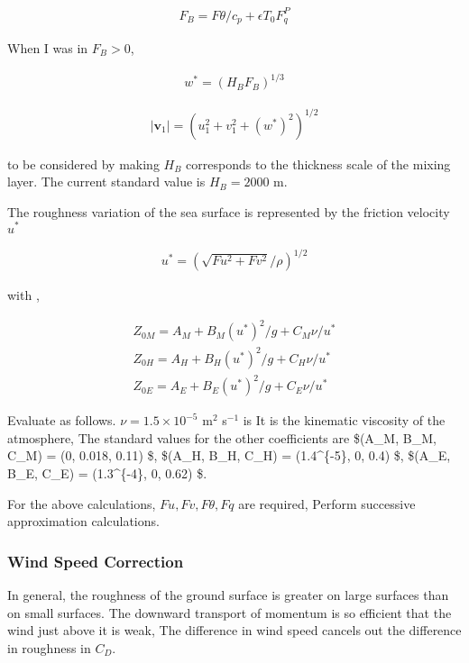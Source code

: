 \begin{eqnarray}
  F_B = F\theta/c_p + \epsilon T_0 F_q^P
\end{eqnarray}

When I was in \(F_B >0\),

\begin{eqnarray}
  w^* = ( H_{B} F_B )^{1/3}
\end{eqnarray}

\begin{eqnarray}
  |\mathbf{v}_1| = \left( u_1^2 + v_1^2 + (w^*)^2 \right)^{1/2}
\end{eqnarray}

to be considered by making \(H_B\) corresponds to the thickness scale of
the mixing layer. The current standard value is \(H_B=2000\) m.

The roughness variation of the sea surface is represented by the
friction velocity \(u^*\)

\begin{eqnarray}
  u^* = \left( \sqrt{Fu^2 + Fv^2}/\rho \right)^{1/2}
\end{eqnarray}

with ,

\begin{eqnarray}
  Z_{0M}  =  A_M + B_M (u^*)^2/g + C_M \nu/u^* \\
  Z_{0H}  =  A_H + B_H (u^*)^2/g + C_H \nu/u^* \\
  Z_{0E}  =  A_E + B_E (u^*)^2/g + C_E \nu/u^* 
\end{eqnarray}

Evaluate as follows. \(\nu=1.5\times10^{-5}\) m\(^2\) s\(^{-1}\) is It
is the kinematic viscosity of the atmosphere, The standard values for
the other coefficients are \$(A\_M, B\_M, C\_M) = (0, 0.018, 0.11) \$,
\$(A\_H, B\_H, C\_H) = (1.4\^{}\{-5\}, 0, 0.4) \$, \$(A\_E,
B\_E, C\_E) = (1.3\^{}\{-4\}, 0, 0.62) \$.

For the above calculations, \(Fu, Fv, F\theta, Fq\) are required,
Perform successive approximation calculations.

\hypertarget{wind-speed-correction}{%
\subsubsection{Wind Speed Correction}\label{wind-speed-correction}}

In general, the roughness of the ground surface is greater on large
surfaces than on small surfaces. The downward transport of momentum is
so efficient that the wind just above it is weak, The difference in wind
speed cancels out the difference in roughness in \(C_D\).

